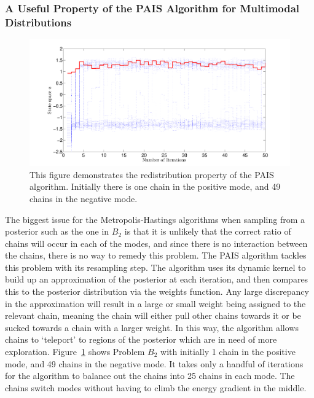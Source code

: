 \documentclass[final]{siamltex}
\begin{document}
\subsubsection{A Useful Property of the PAIS Algorithm for Multimodal Distributions}

\begin{figure}[!h]
\begin{center}
\includegraphics[width=\textwidth]{"figures/BM2_suction"}
\caption{This figure demonstrates the redistribution property of the PAIS algorithm. Initially there is one chain in the positive mode, and 49 chains in the negative mode.}
\label{fig:BM2_suction}
\end{center}
\end{figure}

The biggest issue for the Metropolis-Hastings algorithms when sampling
from a posterior such as the one in $B_2$ is that it is unlikely that
the correct ratio of chains will occur in each of the modes, and since there is no interaction between the chains, there is no way to remedy this problem. The PAIS algorithm tackles this problem with its resampling step. The algorithm uses its dynamic kernel to build up an approximation of the posterior at each iteration, and then compares this to the posterior distribution via the weights function. Any large discrepancy in the approximation will result in a large or small weight being assigned to the relevant chain, meaning the chain will either pull other chains towards it or be sucked towards a chain with a larger weight. In this way, the algorithm allows chains to `teleport' to regions of the posterior which are in need of more exploration. Figure~\ref{fig:BM2_suction} shows Problem $B_2$ with initially 1 chain in the positive mode, and 49 chains in the negative mode. It takes only a handful of iterations for the algorithm to balance out the chains into 25 chains in each mode. The chains switch modes without having to climb the energy gradient in the middle.
\end{document}
